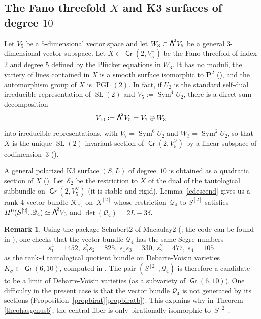 \documentclass[JEP,XML,SOM,Unicode, NoEqCountersInSection,NoFloatCountersInSection]{cedram}
\let\mathcal\mathscr
\theoremstyle{definition}
\newtheorem{rema}[lemm]{Remark}
\renewcommand\P{{\mathbf P}}\let\PP\P
\newcommand\cE{\mathcal{E}}
\newcommand\cK{\mathcal{K}}
\newcommand\cQ{\mathcal{Q}}\let\quotauto\cQ
\DeclareMathOperator{\Gr}{\mathsf{Gr}}
\let\isom\simeq
\let\dual\vee
\let\Ld L
\DeclareMathOperator{\PGL}{PGL}
\DeclareMathOperator{\Sym}{Sym}
\DeclareMathOperator{\SL}{SL}
\newcommand\bw[1]{{\hbox{\large$\mathsf{\Lambda}$}^{\!#1}}}
\newcommand\hilbS{S^{[2]}}
\begin{document}
\subsection{The Fano threefold $X$ and K3 surfaces of degree $10$}\label{secXg6}
Let $V_5$ be a $5$\nobreakdash-dim\-ensional vector space and let $W_3\subset \bw2 V_5$ be a general $3$-dimensional vector subspace.
Let $X\subset \Gr(2,V_5^\dual)$ be the Fano threefold of index $2$ and degree $5$ defined by the Plücker equations in $W_3$.
It has no moduli, the variety of lines contained in $X$ is a smooth surface isomorphic to
$\P^2$ (\cite[Cor.\,(6.6)(ii)]{iskovskikh}), and the automorphism group of $X$ is $\PGL(2)$. In fact, if $U_2$ is the standard self-dual irreducible representation of $\SL(2)$ and $V_5:=\Sym^4\! U_2$, there is a direct sum decomposition
\begin{equation}\label{eqdecompsl2}
V_{10}:=\bw2V_5= V_7 \oplus W_3
\end{equation}
into irreducible representations, with $V_7=\Sym^6\! U_2$ and $W_3=\Sym^2\! U_2$, so that $X$ is the unique $\SL(2)$-invariant section of $\Gr(2,V_5^\dual)$ by a linear subspace of codimension~$3$ (\cite[\S 7.1]{chsh}).

A general polarized K3 surface $(S,L)$ of degree~$10$ is obtained as a quadratic section of $X$ (\cite{mukai}).
Let $\cE_2$ be the restriction to $X$ of the dual of the tautological subbundle on $\Gr(2,V_5^\dual)$ (it is stable and rigid). Lemma \ref{ledescend} gives us a rank-$4$ vector bundle $ \cK_{\cE_2} $ on~$ X^{[2]}$ whose restriction~$\cQ_4 $ to $\hilbS$ satisfies
$H^0(\hilbS,\cQ_4)\isom \bw2V_5$ and $\det(\cQ_4)=2\Ld-3\delta$.

\begin{rema} \label{chernn}
Using the package
Schubert2 of Macaulay2 (\cite{macaulay2}; the code can be found in \cite{comp}), one checks that
the vector bundle $\cQ_4$ has the same Segre numbers
\[
s_1^4 = 1452,\ s_1^2 s_2 = 825,\
s_1 s_3= 330,\ s_2^2 = 477,\ s_4 = 105
\]
as the rank-$4$ tautological quotient bundle on Debarre-Voisin varieties
$K_\sigma\subset \Gr(6,10)$, computed in \cite[(11)]{devo}.
The pair
$(\hilbS,\cQ_4)$ is therefore a candidate to be a limit of Debarre-Voisin varieties (as a subvariety of $\Gr(6,10)$). One difficulty in the present
case is that
the vector bundle $\cQ_4$ is not generated by its sections (Proposition~\ref{propbirat}\eqref{propbiratb}). This explains why in Theorem \ref{theohasgenus6}, the
central fiber is only birationally isomorphic to~$\hilbS$.
\end{rema}
\end{document}
